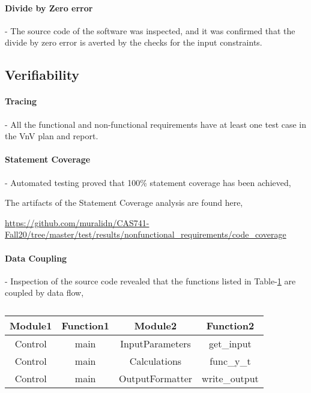 \documentclass[12pt, titlepage]{article}
\begin{document}
\paragraph{Divide by Zero error} - The source code of the \progname{} software was 
inspected, and it was confirmed that the divide by zero error is averted by the checks for the 
input constraints.

\subsection{Verifiability}

\paragraph{Tracing} - All the functional and non-functional requirements have at least 
one test case in the VnV plan and report.

\paragraph{Statement Coverage} - Automated testing proved that 100\% statement
coverage has been achieved,

The artifacts of the Statement Coverage analysis are found here,

 \url{https://github.com/muralidn/CAS741-Fall20/tree/master/test/results/nonfunctional_requirements/code_coverage}

\paragraph{Data Coupling} - Inspection of the source code revealed that the functions listed in Table-\ref{tab:dataCoupling} 
are coupled by data flow,

\begin{table}[]
\caption{}
\label{tab:dataCoupling}
\begin{tabular}{c|c|c|c}
\multicolumn{1}{c|}{Module1} & \multicolumn{1}{c|}{Function1} & Module2         & Function2     \\ \hline
Control                      & main                           & InputParameters & get\_input    \\
Control                      & main                           & Calculations    & func\_y\_t    \\
Control                      & main                           & OutputFormatter & write\_output
\end{tabular}
\end{table}
\end{document}
